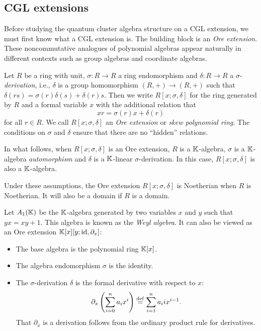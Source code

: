 \subsection{CGL extensions}

Before studying the quantum cluster algebra structure on a CGL extension, we must first
know what a CGL extension is. The building block is an \emph{Ore extension}. These
noncommutative analogues of polynomial algebras appear naturally in different contexts
such as group algebras and coordinate algebras.

\begin{definition}
	Let $R$ be a ring with unit, $\sigma \colon R \to R$ a ring endomorphism and
	$\delta \colon R \to R$ a $\sigma$-\emph{derivation}, i.e.,
	$\delta$ is a group homomorphism $(R, +) \to (R, +)$ such that $\delta (r s) =
		\sigma(r)\delta(s) + \delta(r) s$. Then we write $R[x;\sigma, \delta]$ for the ring generated by $R$ and a formal variable $x$ with the additional relation that
	\begin{equation*}
		x r = \sigma(r) x + \delta(r)
	\end{equation*}
	for all $r \in R$. We call $R[x;\sigma, \delta]$ an \emph{Ore extension} or \emph{skew polynomial ring}. The conditions
	on $\sigma$ and $\delta$ ensure that there are no ``hidden'' relations.
\end{definition}
%
\begin{convention}
	In what follows, when $R[x;\sigma, \delta]$ is an Ore extension, $R$ is a
	$\mathbb{K}$-algebra, $\sigma$ is a $\mathbb{K}$-algebra \emph{automorphism} and $\delta$ is a
	$\mathbb{K}$-linear $\sigma$-derivation. In this case, $R[x;\sigma, \delta]$ is also a
	$\mathbb{K}$-algebra.
\end{convention}
%
Under these assumptions, the Ore extension $R[x; \sigma, \delta]$ is Noetherian when
$R$ is Noetherian. It will also be a domain if $R$ is a domain.

\begin{example}
	Let $A_1(\mathbb{K})$ be the $\mathbb{K}$-algebra generated by two variables $x$ and $y$ such that $yx =
		xy + 1$. This algebra is known as the \emph{Weyl algebra}. It can
	also be viewed as an Ore extension $\mathbb{K}[x][y; \operatorname{id}, \partial_x]$:
	\begin{itemize}
		\item The base algebra is the polynomial ring $\mathbb{K}[x]$.
		\item The algebra endomorphism $\sigma$ is the identity.
		\item The $\sigma$-derivation $\delta$ is the formal derivative with respect to $x$:
		      \begin{equation*}
			      \partial_x \left(\sum_{i=0}^n a_i x^i \right) \overset{\mathrm{def}}{=} \sum_{i=1}^{n} a_i i x^{i-1}.
		      \end{equation*}
		      That $\partial_x$ is a derivation follows from the ordinary product rule for derivatives.
	\end{itemize}
\end{example}


